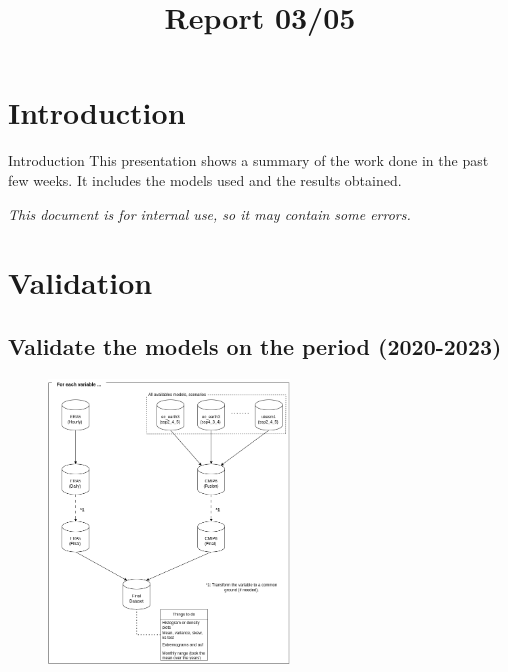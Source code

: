 \documentclass[xcolor=dvipsnames]{beamer}
\title[Report 03/05]{Report 03/05}
\begin{document}
	
	\begin{frame}
		\titlepage
	\end{frame}
	

	\section{Introduction}

	\begin{frame}{Introduction}
        This presentation shows a summary of the work done in the past few weeks. It includes the models used and the results obtained.
        

        \textit{This document is for internal use, so it may contain some errors.}

	\end{frame}

    \section{Validation}



    \subsection{Validate the models on the period (2020-2023)}

    \begin{frame}
        \begin{figure}
            \centering
                 \includegraphics[width=0.57\textwidth]{images/diagram.png}
            \label{fig:series}
        \end{figure}
    \end{frame}
\end{document}
